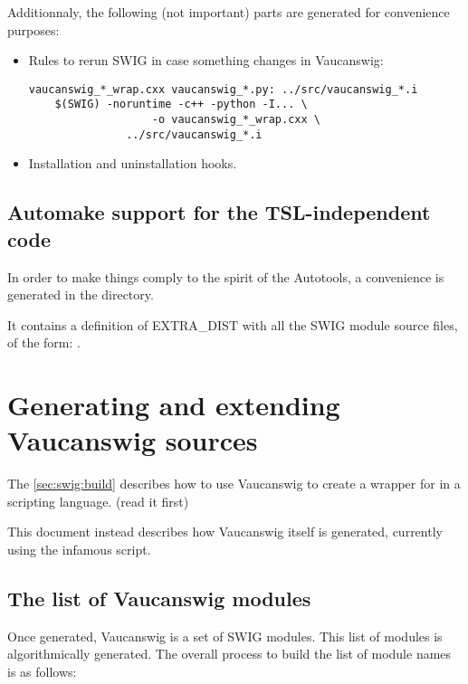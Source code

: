 Additionnaly, the following (not important) parts are generated for
convenience purposes:

\begin{itemize}
\item Rules to rerun SWIG in case something changes in Vaucanswig:
\begin{lstlisting}[language=Make]
vaucanswig_*_wrap.cxx vaucanswig_*.py: ../src/vaucanswig_*.i
	$(SWIG) -noruntime -c++ -python -I... \
	               -o vaucanswig_*_wrap.cxx \
		       ../src/vaucanswig_*.i
\end{lstlisting}%

\item Installation and uninstallation hooks.
\end{itemize}


\subsection{Automake support for the TSL-independent code}

In order to make things comply to the spirit of the Autotools, a
convenience  is generated in the 
directory.

It contains a definition of EXTRA\_DIST with all the SWIG module
source files, of the form: .


\section{Generating and extending Vaucanswig sources}
\label{sec:swig:meta}

The \autoref{sec:swig:build} describes how to use Vaucanswig to create
a wrapper for \Vauc in a scripting language.  (read it first)

This document instead describes how Vaucanswig itself is generated,
currently using the infamous  script.

\subsection{The list of Vaucanswig modules}

Once generated, Vaucanswig is a set of SWIG modules. This list of
modules is algorithmically generated. The overall process to build the
list of module names is as follows:

